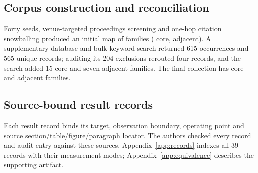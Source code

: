 \subsection{Corpus construction and reconciliation}
Forty seeds, venue-targeted proceedings screening and one-hop citation snowballing produced an initial map of \SnapshotN{} families (\SnapshotCore{} core, \SnapshotAdjacent{} adjacent). A supplementary database and bulk keyword search returned 615 occurrences and 565 unique records; auditing its 204 exclusions rerouted four records, and the search added 15 core and seven adjacent families. The final collection has \FinalCore{} core and \FinalAdjacent{} adjacent families.

\subsection{Source-bound result records}
Each result record binds its target, observation boundary, operating point and source section/table/figure/paragraph locator. The authors checked every record and audit entry against these sources. Appendix~\ref{app:records} indexes all 39 records with their measurement modes; Appendix~\ref{app:equivalence} describes the supporting artifact.

